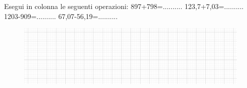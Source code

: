 \item Esegui in colonna le seguenti operazioni: 897+798=.......... 123,7+7,03=.......... 1203-909=.......... 67,07-56,19=..........
\begin{figure}[h]
	\centering
		\includegraphics[width=13cm]{figure/quadretti.png}
\end{figure}
